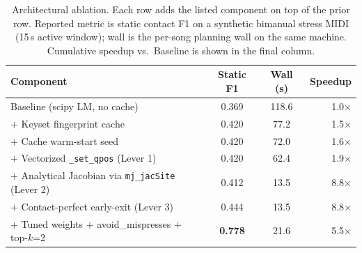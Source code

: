 \begin{table}[t]
\centering
\caption{Architectural ablation. Each row adds the listed component on top
of the prior row. Reported metric is static contact F1 on a synthetic
bimanual stress MIDI (15\,s active window); wall is the per-song planning
wall on the same machine. Cumulative speedup vs.\ Baseline is shown in the
final column.}
\label{tab:ablation}
\begin{tabular}{lccr}
\toprule
Component                                        & Static F1 & Wall (s) & Speedup \\
\midrule
Baseline (scipy LM, no cache)                    & 0.369 & 118.6 & 1.0$\times$ \\
$+$ Keyset fingerprint cache                     & 0.420 &  77.2 & 1.5$\times$ \\
$+$ Cache warm-start seed                        & 0.420 &  72.0 & 1.6$\times$ \\
$+$ Vectorized \texttt{\_set\_qpos} (Lever 1)    & 0.420 &  62.4 & 1.9$\times$ \\
$+$ Analytical Jacobian via \texttt{mj\_jacSite} (Lever 2) & 0.412 &  13.5 & 8.8$\times$ \\
$+$ Contact-perfect early-exit (Lever 3)         & 0.444 &  13.5 & 8.8$\times$ \\
$+$ Tuned weights $+$ avoid\_mispresses $+$ top-$k$=2 & \textbf{0.778} &  21.6 & 5.5$\times$ \\
\bottomrule
\end{tabular}
\end{table}



